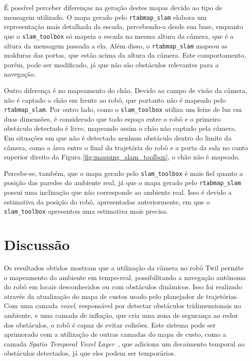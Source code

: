 \documentclass[repeatfields,xlists,xpacks,oneside,yearsonly]{ufrgscca}
\begin{document}
É possível perceber diferenças na geração destes mapas devido ao
tipo de mensagem utilizado. O mapa gerado pelo \texttt{rtabmap\_slam}
elabora um representação mais detalhada da escada, percebendo-a desde
sua base, enquanto que o \texttt{slam\_toolbox} só mapeia a escada na
mesma altura da câmera, que é a altura da mensagem passada a ela.
Além disso, o \texttt{rtabmap\_slam} mapeou as molduras das portas,
que estão acima da altura da câmera. Este comportamento, porém,
pode ser modificado, já que não são obstáculos relevantes para a
navegação.

Outro diferença é no mapeamento do chão. Devido ao campo de visão da
câmera, não é captado o chão em frente ao robô, que portanto não é
mapeado pelo \texttt{rtabmap\_slam}. Por outro lado, como o
\texttt{slam\_toolbox} utiliza um feixe de luz em duas dimensões, é
considerado que todo espaço entre o robô e o primeiro obstáculo
detectado é livre, mapeando assim o chão não captado pela câmera. Em
situações em que não é detectado nenhum obstáculo dentro do limite da
câmera, como a área entre o final da trajetória do robô e a porta da
sala no canto superior direito da Figura
\ref{fig:mapping_slam_toolbox}, o chão não é mapeado.

Percebe-se, também, que o mapa gerado pelo \texttt{slam\_toolbox} é
mais fiel quanto a posição das paredes do ambiente real, já que o
mapa gerado pelo \texttt{rtabmap\_slam} possui uma inclinação que não
corresponde ao ambiente real. Isso é devido a estimativa da posição
do robô, apresentadas anteriormente, em que o \texttt{slam\_toolbox}
apresentou uma estimativa mais precisa.

\chapter{Discussão}
\label{discussao}

Os resultados obtidos mostram que a utilização da câmera no robô Twil
permite o mapeamento do ambiente em tempo-real, possibilitando a
navegação autônoma do robô em locais desconhecidos ou com obstáculos
dinâmicos. Isso foi realizado através da atualização do mapa de
custos usado pelo planejador de trajetórias. Com uma camada
\textit{voxel}, responsável por detectar obstáculos tridimensionais
no ambiente, e uma camada de inflação, que cria uma zona de segurança
ao redor dos obstáculos, o robô é capaz de evitar colisões. Este
sistema pode ser aprimorado com a utilização de outras camadas do
mapa de custo, como a camada \textit{Spatio Temporal Voxel
    Layer}~\cite{stlv_article}, que adiciona um decaimento temporal ao
obstáculos detectados, já que eles podem ser temporários.
\end{document}
